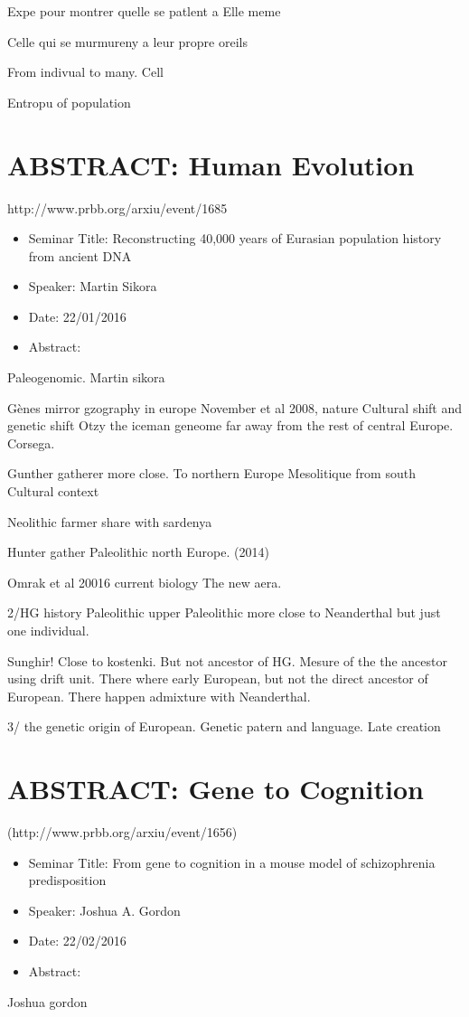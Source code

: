 \documentclass[10pt,letterpaper]{article}
\begin{document}
Expe pour montrer quelle se patlent a Elle meme

Celle qui se murmureny a leur propre oreils

From indivual to many. Cell

Entropu of population


\section{ABSTRACT: Human Evolution}
http://www.prbb.org/arxiu/event/1685

\begin{itemize}
    \item Seminar Title: Reconstructing 40,000 years of Eurasian population history from ancient DNA
    \item Speaker: Martin Sikora
    \item Date: 22/01/2016
    \item Abstract: 
\end{itemize}
Paleogenomic. Martin sikora

Gènes mirror gzography in europe
November et al 2008, nature
Cultural shift and genetic shift
Otzy the iceman geneome far away from the rest of central Europe.
Corsega.

Gunther gatherer more close. To northern Europe
Mesolitique from south
Cultural context

Neolithic farmer share with sardenya

Hunter gather Paleolithic north Europe.
(2014)

Omrak et al 20016 current biology
The new aera.

2/HG history Paleolithic upper Paleolithic more close to Neanderthal but just one individual.

Sunghir!
Close to kostenki. But not ancestor of HG. Mesure of the the ancestor using drift unit.
There where early European, but not the direct ancestor of European.
There happen admixture with Neanderthal.

3/ the genetic origin of European.
Genetic patern and language. Late creation


\section{ABSTRACT: Gene to Cognition}
(http://www.prbb.org/arxiu/event/1656)
\begin{itemize}
    \item Seminar Title: From gene to cognition in a mouse model of schizophrenia predisposition
    \item Speaker: Joshua A. Gordon
    \item Date: 22/02/2016
    \item Abstract:
\end{itemize}
Joshua gordon
\end{document}
